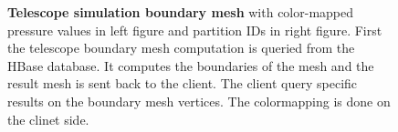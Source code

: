 \documentclass[]{report}
\begin{document}
\begin{figure}[!ht]
	\hfill
	\hfill
	\caption[Telescope Boundary Mesh]{\textbf{Telescope simulation boundary mesh} with color-mapped pressure values in left figure and partition IDs in right figure. First the telescope boundary mesh computation is queried from the HBase database. It computes the boundaries of the mesh and the result mesh is sent back to the client. The client query specific results on the boundary mesh vertices. The colormapping is done on the clinet side.}
	\label{fig:telescope}
\end{figure}
\end{document}
